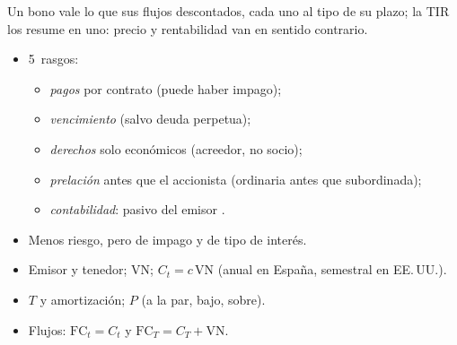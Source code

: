 \documentclass{article}
\begin{document}
\begin{columnas}
\begin{ideaclave}
Un bono vale lo que sus flujos descontados, cada uno al tipo de su plazo; la TIR los resume en uno: precio y rentabilidad van en sentido contrario.
\end{ideaclave}

\begin{itemize}
\item 5~rasgos:
  \begin{itemize}
  \item \emph{pagos} por contrato (puede haber impago);
  \item \emph{vencimiento} (salvo deuda perpetua);
  \item \emph{derechos} solo económicos (acreedor, no socio);
  \item \emph{prelación} antes que el accionista (ordinaria antes que subordinada);
  \item \emph{contabilidad}: pasivo del emisor .
  \end{itemize}
\item Menos riesgo, pero de impago y de tipo de interés.
\end{itemize}

\begin{itemize}
\item Emisor y tenedor;  $\mathrm{VN}$;  $C_t=c\,\mathrm{VN}$ (anual en España, semestral en EE.\,UU.).
\item {} $T$ y amortización;  $P$ (a la par, bajo, sobre).
\item Flujos: $\mathrm{FC}_t=C_t$ y $\mathrm{FC}_T=C_T+\mathrm{VN}$.
\end{itemize}


\end{columnas}
\end{document}
